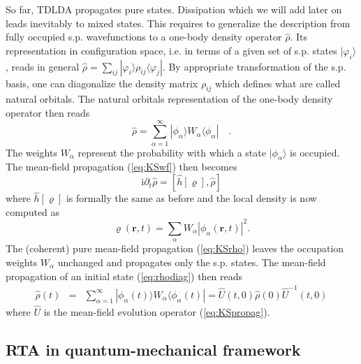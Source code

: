 \documentclass[final,1p]{elsarticle}
\newcommand{\I}{\mathrm{i}}
\newcommand{\PGR}[1]{{\color{blue} #1}}
\begin{document}
So far, TDLDA propagates pure states. Dissipation which we will add
later on leads inevitably to mixed states. This requires to generalize
the description from fully occupied s.p. wavefunctions to a one-body
density operator $\hat{\rho}$.  \PGR{Its representation in
  configuration space, i.e. in terms of a given set of s.p. states
  $|\varphi_i\rangle$, reads in general
  $\hat{\rho}=\sum_{ij}|\varphi_i\rangle\rho_{ij}\langle\varphi_j|$.
  By appropriate transformation of the s.p. basis, one can diagonalize
  the density matrix $\rho_{ij}$ which defines what are called natural
  orbitals. The natural orbitals representation of the one-body
  density operator then reads}
\begin{equation}
  \hat{\rho}
  =
  \sum_{\alpha=1}^\infty|\phi_\alpha\rangle W_\alpha\langle\phi_\alpha|
  \quad.
\label{eq:rhodiag}
\end{equation}
\PGR{The weights $W_\alpha$ represent} the probability with which a
state $|\phi_\alpha\rangle$ is occupied. The mean-field propagation
(\ref{eq:KSwf}) then becomes
\begin{equation}
  \I\partial_t\hat{\rho}
  =
  \left[\hat{h}[\varrho],\hat{\rho}\right]
\label{eq:KSrho}
\end{equation}
where $\hat{h}[\varrho]$ is formally the same as before and the
local density is now computed as
\begin{equation}
\varrho(\mathbf{r},t)=\sum_\alpha{W}_\alpha|\phi_\alpha(\mathbf{r},t)|^2 .
\label{eq:rhoW}
\end{equation}
The \PGR{(coherent)} pure mean-field propagation (\ref{eq:KSrho})
leaves the occupation weights $W_\alpha$ unchanged and propagates only
the s.p. states.  The mean-field propagation of an initial state
(\ref{eq:rhodiag}) then reads
\begin{eqnarray}
  \hat{\rho}(t)
  &=&
  \sum_{\alpha=1}^\infty
  |\phi_\alpha(t)\rangle W_\alpha\langle\phi_\alpha(t)|
  =
  \hat{U}(t,0)\hat{\rho}(0)\hat{U}^{-1}(t,0)
\label{eq:KSrhoevol}
\end{eqnarray}
where $\hat{U}$ is the mean-field evolution operator (\ref{eq:KSpropag}).

\subsection{RTA in quantum-mechanical framework}
\end{document}

